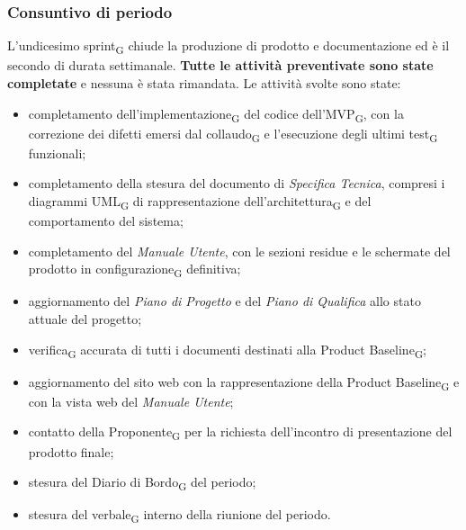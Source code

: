 ﻿\documentclass[a4paper, 10pt, colorlinks=true, linkcolor=black, urlcolor=blue, citecolor=blue, hidelinks]{article}
\begin{document}
\subsubsection{Consuntivo di periodo}
L'undicesimo sprint\textsubscript{G} chiude la produzione di prodotto e documentazione ed è il secondo di durata settimanale. \textbf{Tutte le attività preventivate sono state completate} e nessuna è stata rimandata. Le attività svolte sono state:
\begin{itemize}
    \item completamento dell'implementazione\textsubscript{G} del codice dell'MVP\textsubscript{G}, con la correzione dei difetti emersi dal collaudo\textsubscript{G} e l'esecuzione degli ultimi test\textsubscript{G} funzionali;

    \item completamento della stesura del documento di \textit{Specifica Tecnica}, compresi i diagrammi UML\textsubscript{G} di rappresentazione dell'architettura\textsubscript{G} e del comportamento del sistema;

    \item completamento del \textit{Manuale Utente}, con le sezioni residue e le schermate del prodotto in configurazione\textsubscript{G} definitiva;

    \item aggiornamento del \textit{Piano di Progetto} e del \textit{Piano di Qualifica} allo stato attuale del progetto;

    \item verifica\textsubscript{G} accurata di tutti i documenti destinati alla Product Baseline\textsubscript{G};

    \item aggiornamento del sito web con la rappresentazione della Product Baseline\textsubscript{G} e con la vista web del \textit{Manuale Utente};

    \item contatto della Proponente\textsubscript{G} per la richiesta dell'incontro di presentazione del prodotto finale;

    \item stesura del Diario di Bordo\textsubscript{G} del periodo;

    \item stesura del verbale\textsubscript{G} interno della riunione del periodo.
\end{itemize}
\end{document}
